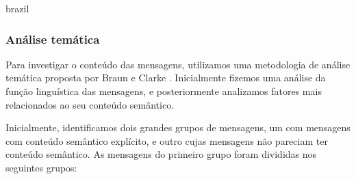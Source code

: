 \begin{otherlanguage*}{brazil}

\subsubsection{Análise temática}
\label{sec:thematic}

Para investigar o conteúdo das mensagens, utilizamos uma metodologia de análise temática proposta por Braun e Clarke \cite{Braun2006}. Inicialmente fizemos uma análise da função linguística das mensagens, e posteriormente analizamos fatores mais relacionados ao seu conteúdo semântico.



Inicialmente, identificamos dois grandes grupos de mensagens, um com mensagens com conteúdo semântico explícito, e outro cujas mensagens não pareciam ter conteúdo semântico. As mensagens do primeiro grupo foram divididas nos seguintes grupos:



\end{otherlanguage*}
